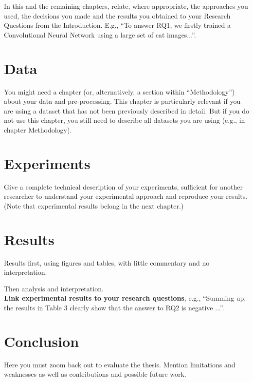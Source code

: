 \documentclass[a4paper,12pt]{Classes/RoboticsLaTeX}
\begin{document}
	In this and the remaining chapters, relate, where appropriate, the approaches you used, the decisions you made and the results you obtained to your Research Questions from the Introduction. E.g., ``To answer RQ1, we firstly trained a Convolutional Neural Network using a large set of cat images...''.
	
	\chapter{Data}
	\label{chap:data}
	
	You might need a chapter (or, alternatively, a section within ``Methodology'') about your data and pre-processing. This chapter is particularly relevant if you are using a dataset that has not been previously described in detail. But if you do not use this chapter, you still need to describe all datasets you are using (e.g., in chapter Methodology).
	
	\chapter{Experiments}
	\label{chap:experiments}
	
	Give a complete technical description of your experiments, sufficient for another researcher to understand your experimental approach and reproduce your results. \\
	
	\noindent (Note that experimental results belong in the next chapter.) 
	
	\chapter{Results}
	\label{chap:results}
	
	Results first, using figures and tables, with little commentary and no interpretation.
	
	
	\noindent Then analysis and interpretation.\\
	
	\textbf{Link experimental results to your research questions}, e.g., ``Summing up, the results in Table 3 clearly show that the answer to RQ2 is negative ...''.
	
	\chapter{Conclusion}
	\label{chap:conclusion}
	
	Here you must zoom back out to evaluate the thesis. Mention limitations and weaknesses as well as contributions and possible future work.
	
\end{document}
